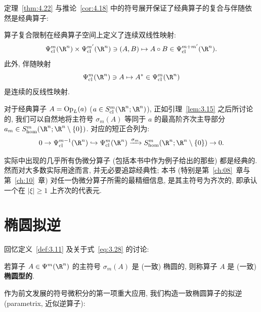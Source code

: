 定理~\ref{thm:4.22} 与推论~\ref{cor:4.18} 中的符号展开保证了经典算子的复合与伴随依然是经典算子:

\begin{proposition}[经典伪微分算子的复合与伴随]\label{prop:4.27}
算子复合限制在经典算子空间上定义了连续双线性映射:
\begin{equation}\label{eq:4.98}
    \Psi_{\mathrm{cl}}^m(\R^n) \times \Psi_{\mathrm{cl}}^{m'}(\R^n) \ni (A, B) \mapsto A \circ B \in \Psi_{\mathrm{cl}}^{m+m'}(\R^n).
\end{equation}
此外, 伴随映射
\begin{equation}\label{eq:4.99}
    \Psi_{\mathrm{cl}}^m(\R^n) \ni A \mapsto A^* \in \Psi_{\mathrm{cl}}^m(\R^n)
\end{equation}
是连续的反线性映射.
\end{proposition}

对于经典算子 $A = \operatorname{Op}_L(a)$ ($a \in S_{\mathrm{cl}}^m(\R^n; \R^n)$), 正如引理~\ref{lem:3.15} 之后所讨论的, 我们可以自然地将主符号 $\sigma_m(A)$ 等同于 $a$ 的最高阶齐次主导部分 $a_m \in S_{\mathrm{hom}}^m(\R^n; \R^n \setminus \{0\})$. 对应的短正合列为:
\begin{equation}\label{eq:4.100}
    0 \to \Psi_{\mathrm{cl}}^{m-1}(\R^n) \hookrightarrow \Psi_{\mathrm{cl}}^m(\R^n) \xrightarrow{\sigma_m} S_{\mathrm{hom}}^m(\R^n; \R^n \setminus \{0\}) \to 0.
\end{equation}

实际中出现的几乎所有伪微分算子 (包括本书中作为例子给出的那些) 都是经典的. 然而对大多数实际用途而言, 并无必要追踪经典性; 本书 (特别是第~\ref{ch:08}~章与第~\ref{ch:10}~章) 对任一伪微分算子所需的最精细信息, 是其主符号为齐次的, 即承认一个在 $|\xi| \ge 1$ 上齐次的代表元.

\section{椭圆拟逆}\label{sec:4.7}
%
%

回忆定义~\ref{def:3.11} 及关于式~\eqref{eq:3.28} 的讨论:

\begin{definition}[椭圆伪微分算子]\label{def:4.28}
若算子 $A \in \Psi^m(\R^n)$ 的主符号 $\sigma_m(A)$ 是 (一致) 椭圆的, 则称算子 $A$ 是 (一致) \textbf{椭圆型的}.
\end{definition}

作为前文发展的符号微积分的第一项重大应用, 我们构造一致椭圆算子的拟逆 (parametrix, 近似逆算子):

